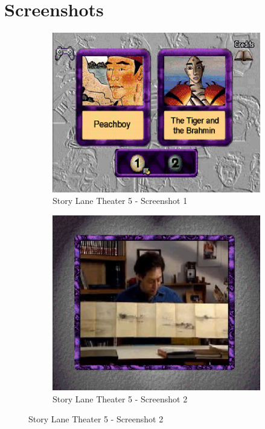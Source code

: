 \clearpage
\newpage

\section{Screenshots}

\begin{figure}[H]
    \centering
    \begin{subfigure}{0.45\textwidth}
        \centering
        \includegraphics[width=\linewidth]{Games/StoryLaneTheater/Images/StoryLaneTheater5Image1.png}
        \caption{Story Lane Theater 5 - Screenshot 1}
    \end{subfigure}
    \begin{subfigure}{0.45\textwidth}
        \includegraphics[width=\linewidth]{Games/StoryLaneTheater/Images/StoryLaneTheater5Image2.png}
        \caption{Story Lane Theater 5 - Screenshot 2}
    \end{subfigure}


\end{figure}

